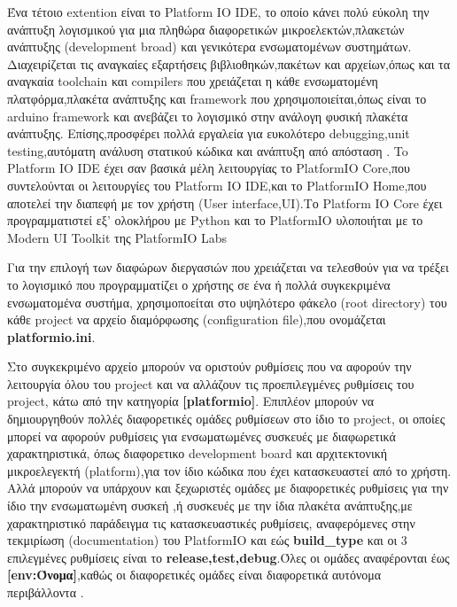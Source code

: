\FloatBarrier 

Ένα τέτοιο extention είναι το Platform IO IDE, το οποίο κάνει πολύ εύκολη την ανάπτυξη λογισμικού για μια πληθώρα διαφορετικών μικροελεκτών,πλακετών ανάπτυξης (development broad) και γενικότερα ενσωματομένων συστημάτων. Διαχειρίζεται τις αναγκαίες εξαρτήσεις βιβλιοθηκών,πακέτων και αρχείων,όπως και τα αναγκαία toolchain και compilers που χρειάζεται η κάθε ενσωματομένη πλατφόρμα,πλακέτα ανάπτυξης και framework που χρησιμοποιείται,όπως είναι το arduino framework και ανεβάζει το λογισμικό στην ανάλογη φυσική πλακέτα ανάπτυξης.
Επίσης,προσφέρει πολλά εργαλεία για ευκολότερο debugging,unit testing,αυτόματη ανάλυση στατικού κώδικα και ανάπτυξη από απόσταση \cite{PlatformIOINTRO}. To Platform IO IDE έχει σαν βασικά μέλη λειτουργίας το PlatformIO Core,που συντελούνται οι λειτουργίες του Platform IO IDE,και το PlatformIO Home,που αποτελεί την διαπεφή με τον χρήστη (User interface,UI).Το Platform IO Core έχει προγραμματιστεί εξ' ολοκλήρου με Python και το PlatformIO υλοποιήται με το Modern UI Toolkit της PlatformIO Labs





Για την επιλογή των διαφώρων διεργασιών που χρειάζεται να τελεσθούν για να τρέξει το λογισμικό που προγραμματίζει ο χρήστης σε ένα ή πολλά συγκεκριμένα ενσωματομένα συστήμα, χρησιμοποείται στο υψηλότερο φάκελο (root directory) του κάθε project   να αρχείο διαμόρφωσης (configuration file),που ονομάζεται \textbf{platformio.ini}. 

Στο συγκεκριμένο αρχείο μπορούν να οριστούν ρυθμίσεις που να αφορούν την λειτουργία όλου του project και να αλλάζουν τις προεπιλεγμένες ρυθμίσεις του project, κάτω από την κατηγορία  \textbf{[platformio]}.
Επιπλέον μπορούν να δημιουργηθούν πολλές διαφορετικές ομάδες ρυθμίσεων στο ίδιο το project, οι οποίες μπορεί να αφορούν ρυθμίσεις για ενσωματωμένες συσκευές με διαφωρετικά χαρακτηριστικά, όπως διαφορετικο development board και αρχιτεκτονική μικροελεγεκτή (platform),για τον ίδιο κώδικα που έχει κατασκευαστεί από το χρήστη.
Αλλά  μπορούν να υπάρχουν και ξεχωριστές ομάδες με διαφορετικές ρυθμίσεις για την ίδιο την ενσωματωμένη συσκεή ,ή συσκευές με την ίδια πλακέτα ανάπτυξης,με χαρακτηριστικό παράδειγμα τις κατασκευαστικές ρυθμίσεις, αναφερόμενες στην τεκμιρίωση (documentation) του PlatformIO και εώς \textbf{build\_type}  και οι 3 επιλεγμένες ρυθμίσεις είναι το \textbf{release,test,debug}.Όλες οι ομάδες αναφέρονται έως  \textbf{[env:Όνομα]},καθώς οι διαφορετικές ομάδες είναι διαφορετικά αυτόνομα περιβάλλοντα  \cite{PlatformIOCONFIG}.


